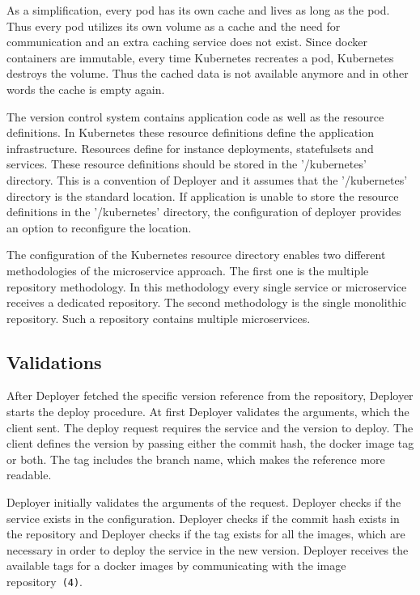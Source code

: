 As a simplification, every pod has its own cache and lives as long as the pod. Thus every
pod utilizes its own volume as a cache and the need for communication and an extra caching
service does not exist. Since docker containers are immutable, every time Kubernetes
recreates a pod, Kubernetes destroys the volume. Thus the cached data is not available
anymore and in other words the cache is empty again.

The version control system contains application code as well as the resource
definitions. In Kubernetes these resource definitions define the application
infrastructure. Resources define for instance deployments, statefulsets and
services. These resource definitions should be stored in the '/kubernetes' directory. This
is a convention of Deployer and it assumes that the '/kubernetes' directory is the
standard location. If application is unable to store the resource definitions in the
'/kubernetes' directory, the configuration of deployer provides an option to reconfigure
the location.

The configuration of the Kubernetes resource directory enables two different methodologies
of the microservice approach. The first one is the multiple repository methodology. In
this methodology every single service or microservice receives a dedicated repository.
The second methodology is the single monolithic repository. Such a repository contains
multiple microservices.

\subsection{Validations}

After Deployer fetched the specific version reference from the repository, Deployer starts
the deploy procedure. At first Deployer validates the arguments, which the client
sent. The deploy request requires the service and the version to deploy. The client
defines the version by passing either the commit hash, the docker image tag or both. The
tag includes the branch name, which makes the reference more readable.

Deployer initially validates the arguments of the request. Deployer checks if the service
exists in the configuration. Deployer checks if the commit hash exists in the repository
and Deployer checks if the tag exists for all the images, which are necessary in order to
deploy the service in the new version. Deployer receives the available tags for a docker
images by communicating with the image repository~\texttt{(4)}.

